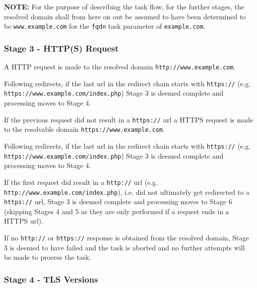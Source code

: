 \documentclass{mscreport}
\begin{document}
\vspace{0.3cm} \noindent
\textbf{NOTE:} For the purpose of describing the task flow, for the further stages, the resolved domain shall from here on out be assumed to have been determined to be \texttt{www.example.com} for the \texttt{fqdn} task parameter of \texttt{example.com}.

\subsubsection{Stage 3 - HTTP(S) Request}

A HTTP request is made to the resolved domain \texttt{http://www.example.com}.

\vspace{0.3cm} \noindent
Following redirects, if the last url in the redirect chain starts with \newline \texttt{https://} (e.g. \texttt{https://www.example.com/index.php}) Stage 3 is deemed complete and processing moves to Stage 4.

\vspace{0.3cm} \noindent
If the previous request did not result in a \texttt{https://} url a HTTPS request is made to the resolvable domain \texttt{https://www.example.com}.

\vspace{0.3cm} \noindent
Following redirects, if the last url in the redirect chain starts with \texttt{https://} (e.g. \newline \texttt{https://www.example.com/index.php}) Stage 3 is deemed complete and processing moves to Stage 4.

\vspace{0.3cm} \noindent
If the first request did result in a \texttt{http://} url (e.g. \texttt{http://www.example.com/index.php}), i.e. did not ultimately get redirected to a \texttt{https://} url, Stage 3 is deemed complete and processing moves to Stage 6 (skipping Stages 4 and 5 as they are only performed if a request ends in a HTTPS url).

\vspace{0.3cm} \noindent
If no \texttt{http://} or \texttt{https://} response is obtained from the resolved domain, Stage 3 is deemed to have failed and the task is aborted and no further attempts will be made to process the task.

\subsubsection{Stage 4 - TLS Versions}
\end{document}
